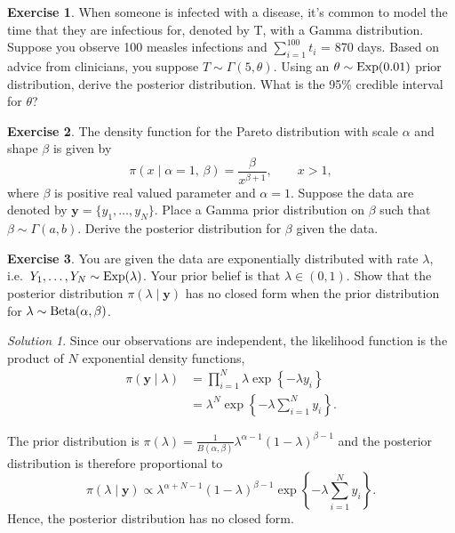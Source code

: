 \documentclass[
]{book}
\theoremstyle{definition}
\theoremstyle{definition}
\theoremstyle{definition}
\newtheorem{exercise}{Exercise}[chapter]
\theoremstyle{definition}
\theoremstyle{remark}
\newtheorem*{solution}{Solution}
\begin{document}
\begin{exercise}
When someone is infected with a disease, it's common to model the time that they are infectious for, denoted by T, with a Gamma distribution. Suppose you observe 100 measles infections and \(\sum_{i=1}^{100}t_i\) = 870 days. Based on advice from clinicians, you suppose \(T \sim \Gamma(5, \theta)\). Using an \(\theta \sim \hbox{Exp}(0.01)\) prior distribution, derive the posterior distribution. What is the 95\% credible interval for \(\theta\)?
\end{exercise}

\begin{exercise}
The density function for the Pareto distribution with scale \(\alpha\) and shape \(\beta\) is given by
\[
\pi(x \mid \alpha = 1,\, \beta) = \frac{\beta}{x^{\beta+1}}, \qquad x > 1,
\]
where \(\beta\) is positive real valued parameter and \(\alpha = 1\). Suppose the data are denoted by \(\boldsymbol{y} = \{y_1, \ldots, y_N\}\). Place a Gamma prior distribution on \(\beta\) such that \(\beta \sim \Gamma(a, b)\). Derive the posterior distribution for \(\beta\) given the data.
\end{exercise}

\begin{exercise}
You are given the data are exponentially distributed with rate \(\lambda,\) i.e.~\(Y_1, \ldots, Y_N \sim \hbox{Exp}(\lambda)\). Your prior belief is that \(\lambda \in (0, 1)\). Show that the posterior distribution \(\pi(\lambda \mid \boldsymbol{y})\) has no closed form when the prior distribution for \(\lambda \sim \hbox{Beta}(\alpha, \beta)\).
\end{exercise}

\begin{solution}
Since our observations are independent, the likelihood function is the product of \(N\) exponential density functions,
\begin{align*}
\pi(\boldsymbol{y} \mid \lambda) &= \prod_{i=1}^N \lambda \exp\left\{-\lambda y_i\right\}\\
& = \lambda^N  \exp\left\{-\lambda \sum_{i=1}^N y_i\right\}.
\end{align*}

The prior distribution is \(\pi(\lambda) = \frac{1}{B(\alpha, \beta)}\lambda^{\alpha - 1}(1-\lambda)^{\beta - 1}\) and the posterior distribution is therefore proportional to
\[
\pi(\lambda \mid \boldsymbol{y}) \propto \lambda^{\alpha +N - 1}(1-\lambda)^{\beta - 1}\exp\left\{-\lambda \sum_{i=1}^N y_i \right\}.
\]
Hence, the posterior distribution has no closed form.
\end{solution}
\end{document}
